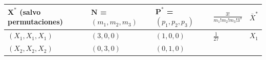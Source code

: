 \documentclass[]{book}
\theoremstyle{definition}
\theoremstyle{definition}
\theoremstyle{definition}
\theoremstyle{remark}
\begin{document}
\begin{longtable}[]{@{}lllll@{}}
\toprule
\begin{minipage}[b]{0.18\columnwidth}\raggedright\strut
\(\mathbf{X}^{\ast}\) (salvo permutaciones)\strut
\end{minipage} & \begin{minipage}[b]{0.16\columnwidth}\raggedright\strut
\(\mathbf{N}\) = \(\left( m_1,m_2,m_3 \right)\)\strut
\end{minipage} & \begin{minipage}[b]{0.16\columnwidth}\raggedright\strut
\(\mathbf{P}^{\ast}\) = \(\left(p_1,p_2,p_3 \right)\)\strut
\end{minipage} & \begin{minipage}[b]{0.17\columnwidth}\raggedright\strut
\(\frac{3!}{m_1!m_2!m_3!3^{3}}\)\strut
\end{minipage} & \begin{minipage}[b]{0.18\columnwidth}\raggedright\strut
\(\bar{X}^{\ast}\)\strut
\end{minipage}\tabularnewline
\midrule
\endhead
\begin{minipage}[t]{0.18\columnwidth}\raggedright\strut
\(\left( X_1,X_1,X_1 \right)\)\strut
\end{minipage} & \begin{minipage}[t]{0.16\columnwidth}\raggedright\strut
\(\left( 3,0,0 \right)\)\strut
\end{minipage} & \begin{minipage}[t]{0.16\columnwidth}\raggedright\strut
\(\left(1,0,0 \right)\)\strut
\end{minipage} & \begin{minipage}[t]{0.17\columnwidth}\raggedright\strut
\(\frac{1}{27}\)\strut
\end{minipage} & \begin{minipage}[t]{0.18\columnwidth}\raggedright\strut
\(X_1\)\strut
\end{minipage}\tabularnewline
\begin{minipage}[t]{0.18\columnwidth}\raggedright\strut
\(\left( X_2,X_2,X_2 \right)\)\strut
\end{minipage} & \begin{minipage}[t]{0.16\columnwidth}\raggedright\strut
\(\left( 0,3,0 \right)\)\strut
\end{minipage} & \begin{minipage}[t]{0.16\columnwidth}\raggedright\strut
\(\left(0,1,0 \right)\)\strut
\end{minipage} & \begin{minipage}[t]{0.17\columnwidth}\raggedright\strut

\end{minipage}
\end{longtable}
\end{document}
